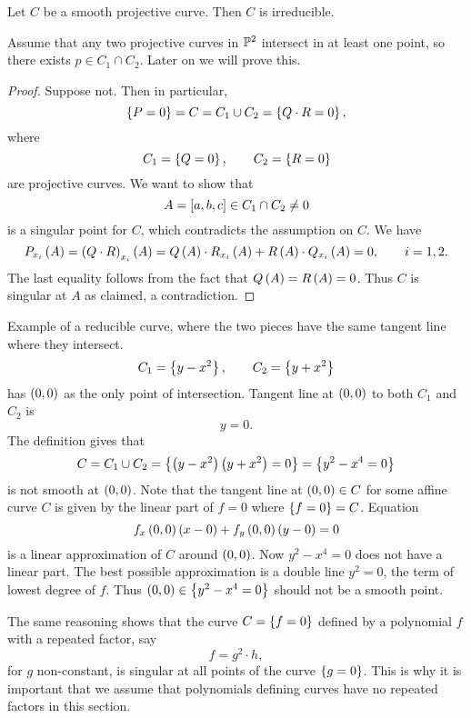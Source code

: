 \begin{theorem}
\label{thm:7.9}
Let $ C $ be a smooth projective curve. Then $ C $ is irreducible.
\end{theorem}

Assume that any two projective curves in $ \P^2 $ intersect in at least one point, so there exists $ p \in C_1 \cap C_2 $. Later on we will prove this.

\begin{proof}
Suppose not. Then in particular,
$$ \cb{P = 0} = C = C_1 \cup C_2 = \cb{Q \cdot R = 0}, $$
where
$$ C_1 = \cb{Q = 0}, \qquad C_2 = \cb{R = 0} $$
are projective curves. We want to show that
$$ A = \sb{a, b, c} \in C_1 \cap C_2 \ne 0 $$
is a singular point for $ C $, which contradicts the assumption on $ C $. We have
$$ P_{x_i}\rb{A} = \rb{Q \cdot R}_{x_i}\rb{A} = Q\rb{A} \cdot R_{x_i}\rb{A} + R\rb{A} \cdot Q_{x_i}\rb{A} = 0, \qquad i = 1, 2. $$
The last equality follows from the fact that $ Q\rb{A} = R\rb{A} = 0 $. Thus $ C $ is singular at $ A $ as claimed, a contradiction.
\end{proof}


\begin{example*}
Example of a reducible curve, where the two pieces have the same tangent line where they intersect.
$$ C_1 = \cb{y - x^2}, \qquad C_2 = \cb{y + x^2} $$
has $ \rb{0, 0} $ as the only point of intersection. Tangent line at $ \rb{0, 0} $ to both $ C_1 $ and $ C_2 $ is
$$ y = 0. $$
The definition gives that
$$ C = C_1 \cup C_2 = \cb{\rb{y - x^2}\rb{y + x^2} = 0} = \cb{y^2 - x^4 = 0} $$
is not smooth at $ \rb{0, 0} $. Note that the tangent line at $ \rb{0, 0} \in C $ for some affine curve $ C $ is given by the linear part of $ f = 0 $ where $ \cb{f = 0} = C $. Equation
$$ f_x\rb{0, 0}\rb{x - 0} + f_y\rb{0, 0}\rb{y - 0} = 0 $$
is a linear approximation of $ C $ around $ \rb{0, 0} $. Now $ y^2 - x^4 = 0 $ does not have a linear part. The best possible approximation is a double line $ y^2 = 0 $, the term of lowest degree of $ f $. Thus $ \rb{0, 0} \in \cb{y^2 - x^4 = 0} $ should not be a smooth point.
\end{example*}

\begin{remark}
The same reasoning shows that the curve $ C = \cb{f = 0} $ defined by a polynomial $ f $ with a repeated factor, say
$$ f = g^2 \cdot h, $$
for $ g $ non-constant, is singular at all points of the curve $ \cb{g = 0} $. This is why it is important that we assume that polynomials defining curves have no repeated factors in this section.
\end{remark}

